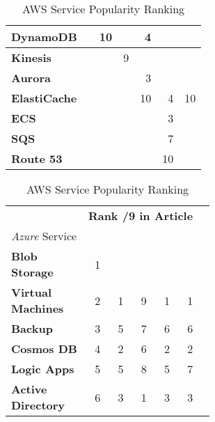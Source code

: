 \begin{table}[h!]
\begin{subtable}[t]{.52\textwidth}
\begin{tabular}[t]{b{2 cm} r r r r r r}
			\textbf{DynamoDB}                 &      & 10   &      & 4    &      &      \\ \midrule[0.25pt]
			\textbf{Kinesis}                  &      &      & 9    &      &      &      \\ \midrule[0.25pt]
			\textbf{Aurora}                   &      &      &      & 3    &      &      \\ \midrule[0.25pt]
			\textbf{ElastiCache}              &      &      &      & 10   & 4    & 10   \\ \midrule[0.25pt]
			\textbf{ECS}                      &      &      &      &      & 3    &      \\ \midrule[0.25pt]
			\textbf{SQS}                      &      &      &      &      & 7    &      \\ \midrule[0.25pt]
			\textbf{Route 53}                 &      &      &      &      & 10   &      \\ \bottomrule
		\end{tabular}%
		\caption{AWS Service Popularity Ranking}
	\end{subtable}%
	\hfill
	\begin{subtable}[t]{.4325\textwidth}
		\footnotesize
		\begin{tabular}[t]{b{2 cm}rrrrrr} \toprule
			& \multicolumn{5}{c}{\textbf{Rank /9 in Article}} \\ \cmidrule{2-6}
			{\textit{Azure} Service}                   & {\cite{noauthor_top_2022-2}} & {\cite{panchal_list_2020}} & {\cite{saran_list_2021}} & {\cite{noauthor_top_2021-1}} & {\cite{noauthor_top_2020}} \\ \midrule
			\textbf{Blob \newline Storage}             & 1    &      &      &      &      \\ \midrule[0.25pt]
			\textbf{Virtual \newline Machines}         & 2    & 1    & 9    & 1    & 1    \\ \midrule[0.25pt]
			\textbf{Backup}                            & 3    & 5    & 7    & 6    & 6    \\ \midrule[0.25pt]
			\textbf{Cosmos DB}                         & 4    & 2    & 6    & 2    & 2    \\ \midrule[0.25pt]
			\textbf{Logic Apps}                        & 5    & 5    & 8    & 5    & 7    \\ \midrule[0.25pt]
			\textbf{Active \newline Directory}         & 6    & 3    & 1    & 3    & 3    \\ \midrule[0.25pt]

\end{tabular}
\end{subtable}
\end{table}
